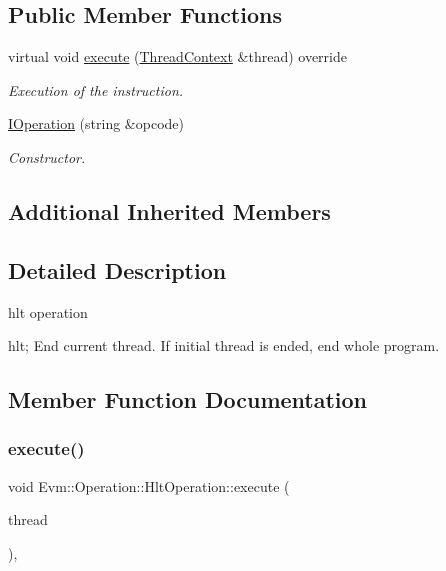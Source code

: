 \subsection*{Public Member Functions}
\begin{DoxyCompactItemize}
\item 
virtual void \mbox{\hyperlink{struct_evm_1_1_operation_1_1_hlt_operation_a9b3fa2b5d0725a4ba842ce6a18c6b02d}{execute}} (\mbox{\hyperlink{struct_evm_1_1_thread_context}{Thread\+Context}} \&thread) override
\begin{DoxyCompactList}\small\item\em Execution of the instruction. \end{DoxyCompactList}\item 
\mbox{\hyperlink{struct_evm_1_1_operation_1_1_hlt_operation_a65e98ee1b1679e12c1d1dd000ebfe937}{I\+Operation}} (string \&opcode)
\begin{DoxyCompactList}\small\item\em Constructor. \end{DoxyCompactList}\end{DoxyCompactItemize}
\subsection*{Additional Inherited Members}


\subsection{Detailed Description}
hlt operation 

hlt; End current thread. If initial thread is ended, end whole program. 

\subsection{Member Function Documentation}
\mbox{\label{struct_evm_1_1_operation_1_1_hlt_operation_a9b3fa2b5d0725a4ba842ce6a18c6b02d}} 
\subsubsection{\texorpdfstring{execute()}{execute()}}
{\footnotesize\ttfamily void Evm\+::\+Operation\+::\+Hlt\+Operation\+::execute (\begin{DoxyParamCaption}\item[{\mbox{\hyperlink{struct_evm_1_1_thread_context}{Thread\+Context}} \&}]{thread }\end{DoxyParamCaption})\hspace{0.3cm}{\ttfamily [override]}, {\ttfamily [virtual]}}



